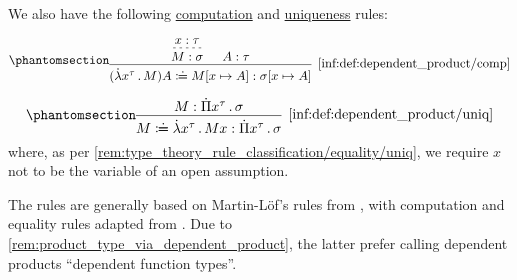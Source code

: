 \begin{definition}
  We also have the following \hyperref[rem:type_theory_rule_classification/equality/comp]{computation} and \hyperref[rem:type_theory_rule_classification/equality/uniq]{uniqueness} rules:
  \begin{paracol}{2}
    \begin{leftcolumn}
      \ParacolAlignmentHack
      \begin{equation*}\taglabel[\ensuremath{ \Pi_\beta }]{inf:def:dependent_product/comp}
        \begin{prooftree}
          \hypo{ x: \tau }
          \infer[dashed]1{ M: \sigma }

          \hypo{ A: \tau }
          \infer2[\ref{inf:def:dependent_product/comp}]{ (\qabs {x^\tau} M) A \syndefeq M[x \mapsto A]: \sigma[x \mapsto A] }
        \end{prooftree}
      \end{equation*}
    \end{leftcolumn}

    \begin{rightcolumn}
      \ParacolAlignmentHack
      \begin{equation*}\taglabel[\ensuremath{ \Pi_\eta }]{inf:def:dependent_product/uniq}
        \begin{prooftree}
          \hypo{ M: \qprod {x^\tau} \sigma }
          \infer1[\ref{inf:def:dependent_product/uniq}]{ M \syndefeq \qabs {x^\tau} M x: \qprod {x^\tau} \sigma },
        \end{prooftree}
      \end{equation*}
      where, as per \cref{rem:type_theory_rule_classification/equality/uniq}, we require \( x \) not to be the variable of an open assumption.
    \end{rightcolumn}
  \end{paracol}
\end{definition}
\begin{comments}
  \item The rules are generally based on Martin-L\"of's rules from \cite[35]{MartinLöf1984IntuitionisticTypeTheory}, with computation and equality rules adapted from \cite[\S A.2.4]{UnivalentFoundationsProgram2013HoTT}. Due to \cref{rem:product_type_via_dependent_product}, the latter prefer calling dependent products \enquote{dependent function types}.
\end{comments}

